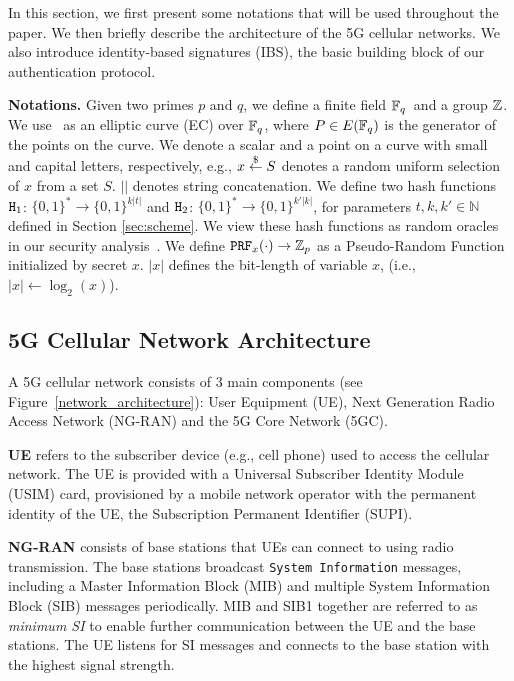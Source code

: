 In this section, we first present some notations that will be used throughout the paper. We then briefly describe the architecture of the 5G cellular networks. We also introduce identity-based signatures (IBS), the basic building block of our authentication protocol.

\noindent \textbf{Notations.}  Given two primes $p$ and $q$, we define a finite field $\mathbb{F}_q$~and a group $\mathbb{Z}$.  We use \EC~as an elliptic curve (EC) over $\mathbb{F}_q$, where  $P\in E(\mathbb{F}_q)$ is the generator of the points on the curve.  We denote a scalar and a point on a curve with small and capital letters, respectively, e.g.,  $ x\stackrel{\$}{\leftarrow}{} S $ denotes a random uniform selection of  $x$ from a set $S$. $||$ denotes string concatenation.  We define two hash functions  $ \mathtt{H}_1$: $ \{0,1\}^{*}  \rightarrow \{0,1\}^{k|t|}$  and  $ \mathtt{H}_2$: $ \{0,1\}^*  \rightarrow   \{0,1\}^{k'|k|}$, for parameters $t,k,k'\in \mathbb{N}$ defined in Section \ref{sec:scheme}. We view these hash functions as random oracles in our security 
analysis~\cite{RandomOracleModel93}.  We define $\mathtt{PRF}_x(\cdot)\rightarrow \mathbb{Z}_p$ as a Pseudo-Random Function initialized by secret $x$. $|x|$ defines the bit-length of variable $x$, (i.e.,$|x|\gets\log_2(x)$).
 
\subsection{5G Cellular Network Architecture}

A 5G cellular network consists of 3 main components (see Figure~\ref{network_architecture}): User Equipment (UE), Next Generation Radio Access Network (NG-RAN) and the 5G Core Network (5GC). 

\noindent  \textbf{UE} refers to the subscriber device (e.g., cell phone) used to access the cellular network. The UE is provided with a Universal Subscriber Identity Module (USIM) card, provisioned by 
a mobile network operator with the permanent identity of the UE, the Subscription Permanent Identifier (SUPI). 

\noindent \textbf{NG-RAN} consists of base stations that UEs can connect to using radio transmission. The base stations broadcast \texttt{System Information} messages, including a Master Information Block (MIB) and multiple System Information Block (SIB) messages periodically. 
MIB and SIB1 together are referred to as \textit{minimum SI}
to enable further communication between the UE and the base stations. The UE listens for SI messages and connects to the base station with the highest signal strength. 

